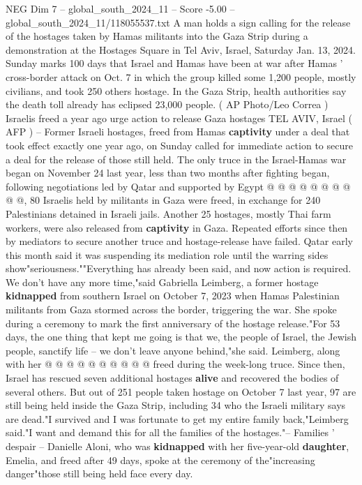 \begin{textsample}{NEG Dim 7 – global\_south\_2024\_11 – Score -5.00 – global\_south\_2024\_11/118055537.txt}  \label{ex:f7_neg_433}
A man holds a sign calling for the release of the hostages taken by Hamas militants into the Gaza Strip during a demonstration at the Hostages Square in Tel Aviv, Israel, Saturday Jan. 13, 2024.
Sunday marks 100 days that Israel and Hamas have been at war after Hamas ' cross-border attack on Oct. 7 in which the group killed some 1,200 people, mostly civilians, and took 250 others hostage.
In the Gaza Strip, health authorities say the death toll already has eclipsed 23,000 people. ( AP Photo/Leo Correa ) Israelis freed a year ago urge action to release Gaza hostages TEL AVIV, Israel ( AFP ) -- Former Israeli hostages, freed from Hamas \textbf{captivity} under a deal that took effect exactly one year ago, on Sunday called for immediate action to secure a deal for the release of those still held.
The only truce in the Israel-Hamas war began on November 24 last year, less than two months after fighting began, following negotiations led by Qatar and supported by Egypt @ @ @ @ @ @ @ @ @ @, 80 Israelis held by militants in Gaza were freed, in exchange for 240 Palestinians detained in Israeli jails.
Another 25 hostages, mostly Thai farm workers, were also released from \textbf{captivity} in Gaza.
Repeated efforts since then by mediators to secure another truce and hostage-release have failed.
Qatar early this month said it was suspending its mediation role until the warring sides show"seriousness.""Everything has already been said, and now action is required.
We don't have any more time,"said Gabriella Leimberg, a former hostage \textbf{kidnapped} from southern Israel on October 7, 2023 when Hamas Palestinian militants from Gaza stormed across the border, triggering the war.
She spoke during a ceremony to mark the first anniversary of the hostage release."For 53 days, the one thing that kept me going is that we, the people of Israel, the Jewish people, sanctify life -- we don't leave anyone behind,"she said.
Leimberg, along with her @ @ @ @ @ @ @ @ @ @ freed during the week-long truce.
Since then, Israel has rescued seven additional hostages \textbf{alive} and recovered the bodies of several others.
But out of 251 people taken hostage on October 7 last year, 97 are still being held inside the Gaza Strip, including 34 who the Israeli military says are dead."I survived and I was fortunate to get my entire family back,"Leimberg said."I want and demand this for all the families of the hostages."-- Families ' despair -- Danielle Aloni, who was \textbf{kidnapped} with her five-year-old \textbf{daughter}, Emelia, and freed after 49 days, spoke at the ceremony of the"increasing danger"those still being held face every day.

\end{textsample}
